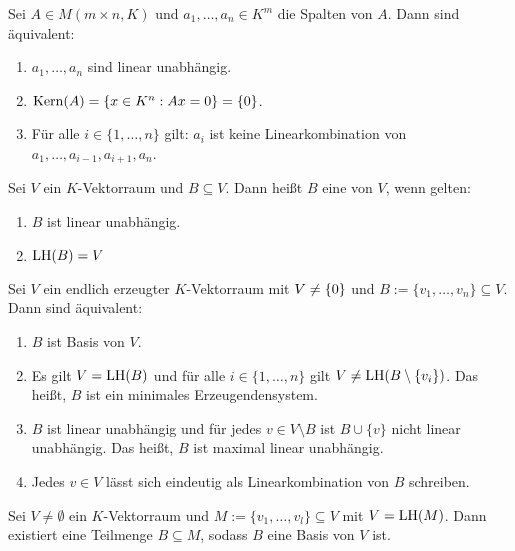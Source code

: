 \setcounter{definition}{8}
\begin{satz}
	\label{satz:I.8.9}
	Sei $A \in M(m\times n, K)$ und $a_1, \dots, a_n \in K^m$ die Spalten von $A$.
	Dann sind äquivalent:
	\begin{enumerate}[(1)]
		\item $a_1,\dots,a_n$ sind linear unabhängig.
		\item $\operatorname{Kern}(A) = \{x \in K^n : Ax = 0\} = \{0\}$.
		\item Für alle $i \in \{1,\dots,n\}$ gilt:
		$a_i$ ist keine Linearkombination von $a_1,\dots,a_{i-1},a_{i+1},a_n$.
	\end{enumerate}
\end{satz}
\newpage
\begin{definition}[Basis]
	\label{def:I.8.10}
	Sei $V$ ein $K$-Vektorraum und $B \subseteq V$.
	Dann heißt $B$ eine  von $V$, wenn gelten:
	\begin{enumerate}[(1)]
		\item $B$ ist linear unabhängig.
		\item $\operatorname{LH}(B) = V$
	\end{enumerate}
\end{definition}

\setcounter{definition}{11}
\begin{satz}
	\label{satz:I.8.12}
	Sei $V$ ein endlich erzeugter $K$-Vektorraum mit $V \neq \{0\}$ und $B := \{v_1,\dots,v_n\} \subseteq V$.
	Dann sind äquivalent:
	\begin{enumerate}[(1)]
		\item $B$ ist Basis von $V$.
		\item Es gilt $V = \operatorname{LH}(B)$ und für alle $i \in \{1,\dots,n\}$ gilt $V \neq \operatorname{LH}(B \setminus \{v_i\})$.
		Das heißt, $B$ ist ein minimales Erzeugendensystem.
		\item $B$ ist linear unabhängig und für jedes $v \in V \setminus B$ ist $B \cup \{v\}$ nicht linear unabhängig.
		Das heißt, $B$ ist maximal linear unabhängig.
		\item Jedes $v \in V$ lässt sich eindeutig als Linearkombination von $B$ schreiben.
	\end{enumerate}
\end{satz}

\begin{satz}[Basisauswahlsatz]
	\label{satz:I.8.13}
	Sei $V \neq \emptyset$ ein $K$-Vektorraum und $M := \{v_1,\dots,v_l\} \subseteq V$ mit $V = \operatorname{LH}(M)$.
	Dann existiert eine Teilmenge $B \subseteq M$, sodass $B$ eine Basis von $V$ ist.
\end{satz}

